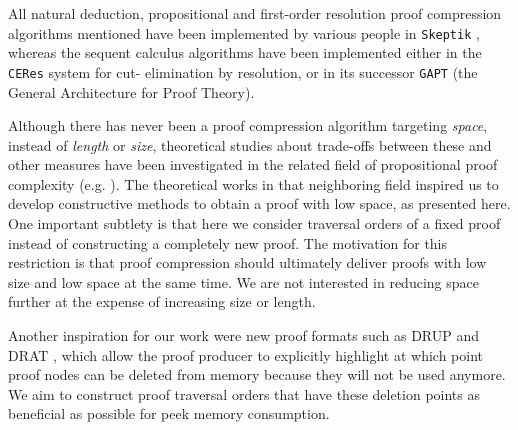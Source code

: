 All natural deduction, propositional and first-order resolution proof compression algorithms mentioned have been implemented by various people in \texttt{Skeptik} \cite{Boudou2014}, whereas the sequent calculus algorithms have been implemented either in the \texttt{CERes} system \cite{DBLP:conf/cade/DunchevLLWP10} for cut- elimination by resolution, or in its successor \texttt{GAPT} \cite{GAPT} (the General Architecture for Proof Theory).

Although there has never been a proof compression algorithm targeting \emph{space}, instead of \emph{length} or \emph{size}, theoretical studies about trade-offs between these and other measures have been investigated in the related field of propositional proof complexity (e.g. \cite{Ben-Sasson2002}). The theoretical works in that neighboring field inspired us to develop constructive methods to obtain a proof with low space, as presented here. One important subtlety is that here we consider traversal orders of a fixed proof instead of constructing a completely new proof. The motivation for this restriction is that proof compression should ultimately deliver proofs with low size and low space at the same time. We are not interested in reducing space further at the expense of increasing size or length.

Another inspiration for our work were new proof formats such as DRUP \cite{DRUP} and DRAT \cite{raey}, which allow the proof producer to explicitly highlight at which point proof nodes can be deleted from memory because they will not be used anymore. We aim to construct proof traversal orders that have these deletion points as beneficial as possible for peek memory consumption.
